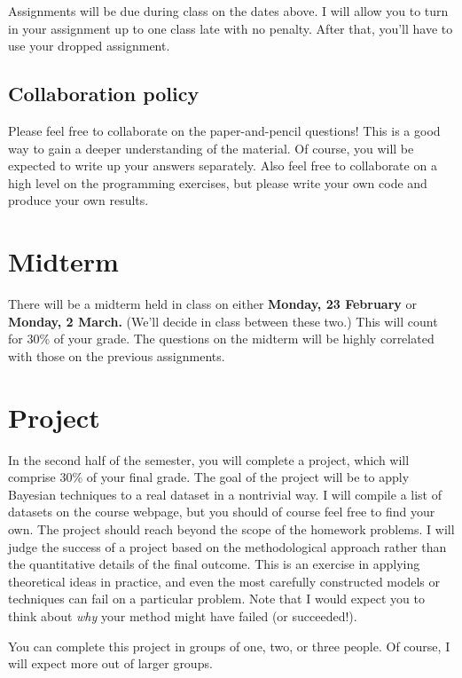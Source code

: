 \documentclass{article}
\begin{document}
Assignments will be due during class on the dates above.  I will allow
you to turn in your assignment up to one class late with no penalty.
After that, you'll have to use your dropped assignment.

\subsection*{Collaboration policy}

Please feel free to collaborate on the paper-and-pencil questions!
This is a good way to gain a deeper understanding of the material.  Of
course, you will be expected to write up your answers separately.
Also feel free to collaborate on a high level on the programming
exercises, but please write your own code and produce your own
results.

\section*{Midterm}

There will be a midterm held in class on either \textbf{Monday, 23
  February} or \textbf{Monday, 2 March.}  (We'll decide in class
between these two.)  This will count for 30\% of your grade.  The
questions on the midterm will be highly correlated with those on the
previous assignments.

\section*{Project}

In the second half of the semester, you will complete a project, which
will comprise 30\% of your final grade. The goal of the project will
be to apply Bayesian techniques to a real dataset in a nontrivial way.
I will compile a list of datasets on the course webpage, but you
should of course feel free to find your own.  The project should reach
beyond the scope of the homework problems.  I will judge the success
of a project based on the methodological approach rather than the
quantitative details of the final outcome.  This is an exercise in
applying theoretical ideas in practice, and even the most carefully
constructed models or techniques can fail on a particular problem.
Note that I would expect you to think about \emph{why} your method
might have failed (or succeeded!).

You can complete this project in groups of one, two, or three people.
Of course, I will expect more out of larger groups.
\end{document}
